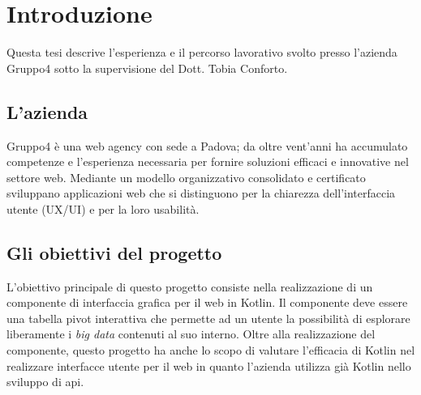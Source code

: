 
\chapter{Introduzione}
\label{cap:introduzione}

Questa tesi descrive l'esperienza e il percorso lavorativo svolto presso l'azienda Gruppo4 sotto la supervisione del Dott. Tobia Conforto.

\section{L'azienda}
Gruppo4 è una web agency con sede a Padova; da oltre vent'anni ha accumulato competenze e l'esperienza necessaria per fornire soluzioni efficaci e innovative nel settore web. Mediante un modello organizzativo consolidato e certificato sviluppano applicazioni web che si distinguono per la chiarezza dell'interfaccia utente (UX/UI) e per la loro usabilità.

\section{Gli obiettivi del progetto}
L'obiettivo principale di questo progetto consiste nella realizzazione di un componente di interfaccia grafica per il web in Kotlin. Il componente deve essere una tabella pivot interattiva che permette ad un utente la possibilità di esplorare liberamente i \emph{big data} contenuti al suo interno. Oltre alla realizzazione del componente, questo progetto ha anche lo scopo di valutare l'efficacia di Kotlin nel realizzare interfacce utente per il web in quanto l'azienda utilizza già Kotlin nello sviluppo di \gls{api}.

